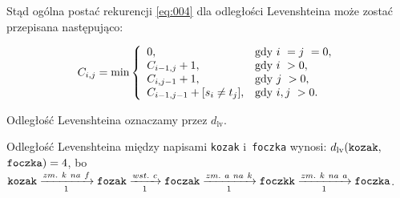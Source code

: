 \documentclass{praca1}
\begin{document}
\begin{definition}
Stąd ogólna postać rekurencji \eqref{eq:004} dla odległości Levenshteina może zostać przepisana następująco:

\begin{equation}
\label{eq:006}
C_{i,j} = \min\left\{
\begin{array}{l l}     
    0, & \text{gdy } i~= j~= 0,\\
    C_{i-1, j} + 1, & \text{gdy } i~> 0, \\
    C_{i, j-1} + 1, & \text{gdy } j~> 0, \\
    C_{i-1, j-1} + [s_{i}\neq t_{j}], & \text{gdy } i, j~> 0.
\end{array}\right.
\end{equation}

Odległość Levenshteina oznaczamy przez $d_{\mathrm{lv}}$.
\end{definition}



\begin{example}
Odległość Levenshteina między napisami \verb|kozak| i~\verb|foczka| wynosi: $d_{\mathrm{lv}}(\verb|kozak|,$ $\verb|foczka|) = 4$, bo~$\verb|kozak| \xrightarrow[1]{zm.\ k\ na\ f} \verb|fozak|  \xrightarrow[1]{wst.\ c} \verb|foczak| \xrightarrow[1]{zm.\ a\ na\ k} \verb|foczkk| \xrightarrow[1]{zm.\ k\ na\ a} \verb|foczka|$.
\end{example}
\end{document}
